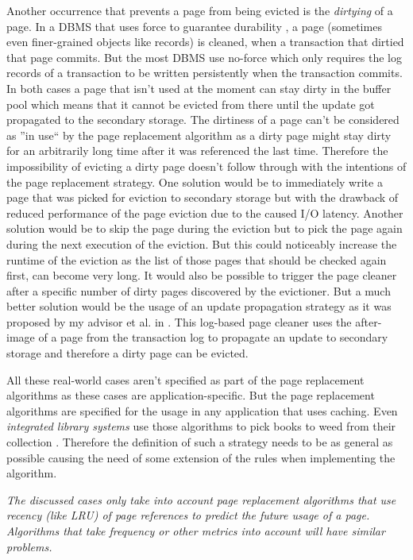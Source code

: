    Another occurrence that prevents a page from being evicted is the \emph{dirtying} of a page. In a DBMS that uses force to guarantee durability \cite{Haerder:1983b}, a page (sometimes even finer-grained objects like records) is cleaned, when a transaction that dirtied that page commits. But the most DBMS use no-force which only requires the log records of a transaction to be written persistently when the transaction commits. In both cases a page that isn't used at the moment can stay dirty in the buffer pool which means that it cannot be evicted from there until the update got propagated to the secondary storage. The dirtiness of a page can't be considered as ''in use`` by the page replacement algorithm as a dirty page might stay dirty for an arbitrarily long time after it was referenced the last time. Therefore the impossibility of evicting a dirty page doesn't follow through with the intentions of the page replacement strategy. One solution would be to immediately write a page that was picked for eviction to secondary storage but with the drawback of reduced performance of the page eviction due to the caused I/O latency. Another solution would be to skip the page during the eviction but to pick the page again during the next execution of the eviction. But this could noticeably increase the runtime of the eviction as the list of those pages that should be checked again first, can become very long. It would also be possible to trigger the page cleaner after a specific number of dirty pages discovered by the evictioner. But a much better solution would be the usage of an update propagation strategy as it was proposed by my advisor et al. in \cite{Sauer:2016}. This log-based page cleaner uses the after-image of a page from the transaction log to propagate an update to secondary storage and therefore a dirty page can be evicted.

    All these real-world cases aren't specified as part of the page replacement algorithms as these cases are application-specific. But the page replacement algorithms are specified for the usage in any application that uses caching. Even \emph{integrated library systems} use those algorithms to pick books to weed from their collection \cite{ChuckFinley}. Therefore the definition of such a strategy needs to be as general as possible causing the need of some extension of the rules when implementing the algorithm.

    \textit{The discussed cases only take into account page replacement algorithms that use recency (like LRU) of page references to predict the future usage of a page. Algorithms that take frequency or other metrics into account will have similar problems.}

